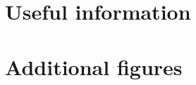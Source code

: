 \chapter{Useful information}
\label{sec:app}


\chapter{Additional figures}
\label{sec:app_additional_figures}
